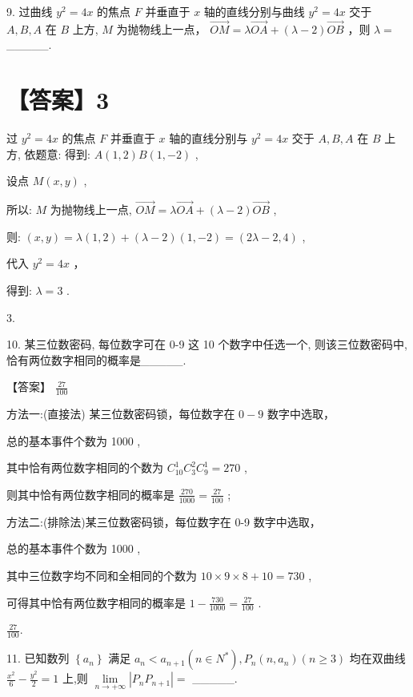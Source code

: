 \documentclass[10pt]{article}
\begin{document}
9. 过曲线 \({y}^{2} = {4x}\) 的焦点 \(F\) 并垂直于 \(x\) 轴的直线分别与曲线 \({y}^{2} = {4x}\) 交于 \(A,B,A\) 在 \(B\) 上方, \(M\) 为抛物线上一点， \(\overrightarrow{OM} = \lambda \overrightarrow{OA} + \left( {\lambda  - 2}\right) \overrightarrow{OB}\) ，则 \(\lambda  =\) \_\_\_\_\_.

\section*{【答案】3}

过 \({y}^{2} = {4x}\) 的焦点 \(F\) 并垂直于 \(x\) 轴的直线分别与 \({y}^{2} = {4x}\) 交于 \(A,B,A\) 在 \(B\) 上方, 依题意: 得到: \(A\left( {1,2}\right) B\left( {1, - 2}\right)\) ,

设点 \(M\left( {x,y}\right)\) ,

所以: \(M\) 为抛物线上一点, \(\overrightarrow{OM} = \lambda \overrightarrow{OA} + \left( {\lambda  - 2}\right) \overrightarrow{OB}\) ,

则: \(\left( {x,y}\right)  = \lambda \left( {1,2}\right)  + \left( {\lambda  - 2}\right) \left( {1, - 2}\right)  = \left( {{2\lambda } - 2,4}\right)\) ,

代入 \({y}^{2} = {4x}\) ，

得到: \(\lambda  = 3\) .

3.

10. 某三位数密码, 每位数字可在 0-9 这 10 个数字中任选一个, 则该三位数密码中, 恰有两位数字相同的概率是\_\_\_\_\_.

【答案】 \(\frac{27}{100}\)

方法一:(直接法) 某三位数密码锁，每位数字在 \(0 - 9\) 数字中选取，

总的基本事件个数为 1000 ,

其中恰有两位数字相同的个数为 \({C}_{10}^{1}{C}_{3}^{2}{C}_{9}^{1} = {270}\) ,

则其中恰有两位数字相同的概率是 \(\frac{270}{1000} = \frac{27}{100}\) ;

方法二:(排除法)某三位数密码锁，每位数字在 0-9 数字中选取，

总的基本事件个数为 1000 ,

其中三位数字均不同和全相同的个数为 \({10} \times  9 \times  8 + {10} = {730}\) ,

可得其中恰有两位数字相同的概率是 \(1 - \frac{730}{1000} = \frac{27}{100}\) .

\(\frac{27}{100}.\)

11. 已知数列 \(\left\{  {a}_{n}\right\}\) 满足 \({a}_{n} < {a}_{n + 1}\left( {n \in  {N}^{ * }}\right) ,{P}_{n}\left( {n,{a}_{n}}\right) \left( {n \geq  3}\right)\) 均在双曲线 \(\frac{{x}^{2}}{6} - \frac{{y}^{2}}{2} = 1\) 上,则 \(\mathop{\lim }\limits_{{n \rightarrow   + \infty }}\left| {{P}_{n}{P}_{n + 1}}\right|  =\) \_\_\_\_\_.
\end{document}
